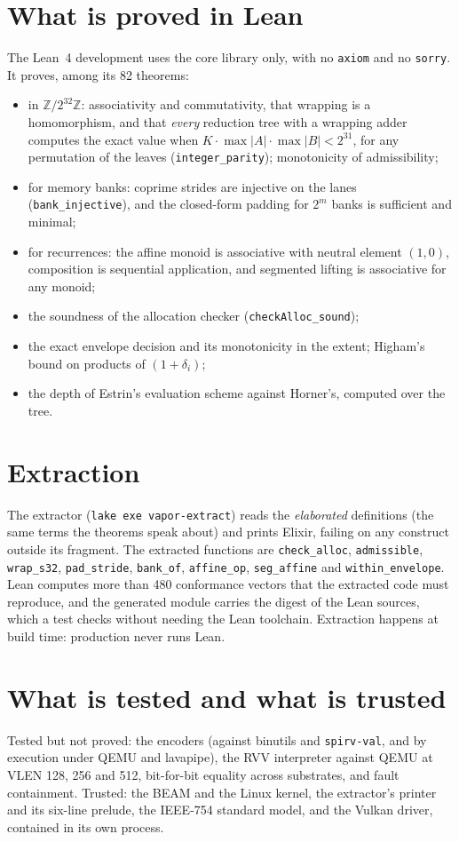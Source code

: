 \section{What is proved in Lean}

The Lean~4 development uses the core library only, with no \texttt{axiom} and no \texttt{sorry}. It
proves, among its 82 theorems:

\begin{itemize}
\item in $\mathbb{Z}/2^{32}\mathbb{Z}$: associativity and commutativity, that wrapping is a homomorphism,
  and that \emph{every} reduction tree with a wrapping adder computes the exact value when
  $K\cdot\max|A|\cdot\max|B| < 2^{31}$, for any permutation of the leaves (\texttt{integer\_parity});
  monotonicity of admissibility;
\item for memory banks: coprime strides are injective on the lanes (\texttt{bank\_injective}), and the
  closed-form padding for $2^m$ banks is sufficient and minimal;
\item for recurrences: the affine monoid is associative with neutral element $(1,0)$, composition is
  sequential application, and segmented lifting is associative for any monoid;
\item the soundness of the allocation checker (\texttt{checkAlloc\_sound});
\item the exact envelope decision and its monotonicity in the extent; Higham's bound on products of
  $(1+\delta_i)$;
\item the depth of Estrin's evaluation scheme against Horner's, computed over the tree.
\end{itemize}

\section{Extraction}

The extractor (\texttt{lake exe vapor-extract}) reads the \emph{elaborated} definitions (the same terms
the theorems speak about) and prints Elixir, failing on any construct outside its fragment. The
extracted functions are \texttt{check\_alloc}, \texttt{admissible}, \texttt{wrap\_s32},
\texttt{pad\_stride}, \texttt{bank\_of}, \texttt{affine\_op}, \texttt{seg\_affine} and
\texttt{within\_envelope}. Lean computes more than 480 conformance vectors that the extracted code must
reproduce, and the generated module carries the digest of the Lean sources, which a test checks without
needing the Lean toolchain. Extraction happens at build time: production never runs Lean.

\section{What is tested and what is trusted}

Tested but not proved: the encoders (against binutils and \texttt{spirv-val}, and by execution under
QEMU and lavapipe), the RVV interpreter against QEMU at VLEN 128, 256 and 512, bit-for-bit equality
across substrates, and fault containment. Trusted: the BEAM and the Linux kernel, the extractor's
printer and its six-line prelude, the IEEE-754 standard model, and the Vulkan driver, contained in its
own process.
